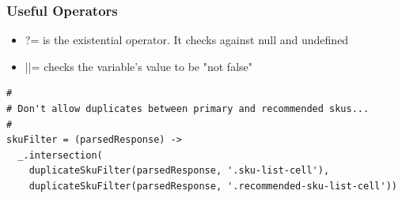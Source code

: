 \documentclass{beamer}
\begin{document}
\begin{frame}
  \frametitle{Useful Operators}
  \begin{itemize}
    \item ?= is the existential operator. It checks against null and undefined
    \item ||= checks the variable's value to be "not false"
   \end{itemize}
\end{frame}


\begin{frame}[fragile]
\begin{verbatim}
#
# Don't allow duplicates between primary and recommended skus...
#
skuFilter = (parsedResponse) ->
  _.intersection(
    duplicateSkuFilter(parsedResponse, '.sku-list-cell'),
    duplicateSkuFilter(parsedResponse, '.recommended-sku-list-cell'))
\end{verbatim}
\end{frame}
\end{document}
